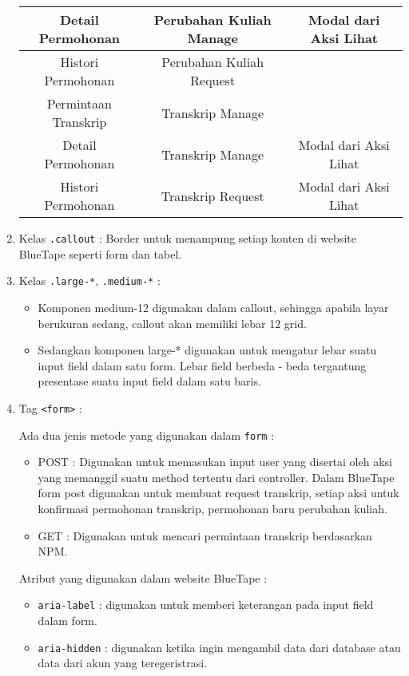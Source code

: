 \begin{enumerate}
\begin{center}
\begin{tabular}{||c | c | c||}
			\hline
			Detail Permohonan  &  Perubahan Kuliah Manage & Modal dari Aksi Lihat\\
			\hline
			Histori Permohonan &  Perubahan Kuliah Request & \\
			\hline
			Permintaan Transkrip &  Transkrip Manage &\\
			\hline
			Detail Permohonan &   Transkrip Manage & Modal dari Aksi Lihat\\
			\hline
			Histori Permohonan &  Transkrip Request & Modal dari Aksi Lihat\\
			\hline	
		\end{tabular}
	\end{center}	
	\item Kelas \colorbox{mygray}{\texttt{.callout}} : Border untuk menampung setiap konten di website BlueTape seperti form dan tabel. 
	\item Kelas \colorbox{mygray}{\texttt{.large-*}}, \colorbox{mygray}{\texttt{.medium-*}} :
	\begin{itemize}
		\item Komponen medium-12 digunakan dalam callout, sehingga apabila layar berukuran sedang, callout akan memiliki lebar 12 grid.
		\item Sedangkan komponen  large-* digunakan untuk mengatur lebar suatu input field dalam satu form. Lebar field berbeda - beda tergantung presentase suatu input field dalam satu baris.
	\end{itemize} 
	\item Tag \colorbox{mygray}{\texttt{<form>}} : \par
	Ada dua jenis metode yang digunakan dalam \texttt{form} :
	\begin{itemize}
		\item POST : Digunakan untuk memasukan input user yang disertai oleh aksi yang memanggil suatu method tertentu dari controller. Dalam BlueTape form post digunakan untuk membuat request transkrip, setiap aksi untuk konfirmasi permohonan transkrip, permohonan baru  perubahan kuliah.
		\item GET : Digunakan untuk mencari permintaan transkrip berdasarkan NPM.
	\end{itemize}	  
	Atribut yang digunakan dalam website BlueTape : 	
	\begin{itemize}
		\item \colorbox{mygray}{\texttt{aria-label}} : digunakan untuk memberi keterangan pada input field dalam form.
		\item \colorbox{mygray}{\texttt{aria-hidden}} : digunakan ketika ingin mengambil data dari database atau data dari akun yang teregeristrasi.

\end{itemize}
\end{enumerate}
